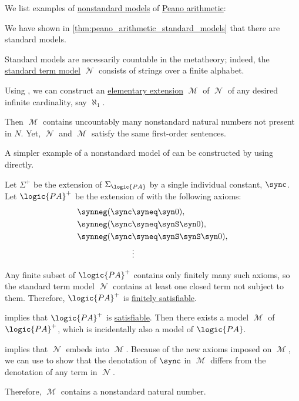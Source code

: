 \begin{example}\label{ex:peano_arithmetic_nonstandard_models}
  We list examples of \hyperref[def:peano_arithmetic_standard_model]{nonstandard models} of \hyperref[def:peano_arithmetic]{Peano arithmetic}:
  \begin{thmenum}
     We have shown in \cref{thm:peano_arithmetic_standard_models} that there are standard models.

    Standard models are necessarily countable in the metatheory; indeed, the \hyperref[def:peano_arithmetic_term_model]{standard term model} \( \mscrN \) consists of strings over a finite alphabet.

    Using , we can construct an \hyperref[def:elementary_embedding]{elementary extension} \( \mscrM \) of \( \mscrN \) of any desired infinite cardinality, say \hyperref[def:aleph_hierarchy]{\( \aleph_1 \)}.

    Then \( \mscrM \) contains uncountably many nonstandard natural numbers not present in \( N \). Yet, \( \mscrN \) and \( \mscrM \) satisfy the same first-order sentences.

     A simpler example of a nonstandard model of  can be constructed by using  directly.

    Let \( \Sigma^+ \) be the extension of \( \Sigma_{\logic{PA}} \) by a single individual constant, \( \sync \). Let \( \logic{PA}^+ \) be the extension of  with the following axioms:
    \begin{align*}
      \synneg (\sync &\syneq \syn0), \\
      \synneg (\sync &\syneq \synS \syn0), \\
      \synneg (\sync &\syneq \synS \synS \syn0), \\
                     &\vdots
    \end{align*}

    Any finite subset of \( \logic{PA}^+ \) contains only finitely many such axioms, so the standard term model \( \mscrN \) contains at least one closed term not subject to them. Therefore, \( \logic{PA}^+ \) is \hyperref[def:finitely_satisfiable_set_of_sentences]{finitely satisfiable}.

     implies that \( \logic{PA}^+ \) is \hyperref[def:fol_semantics/satisfaction]{satisfiable}. Then there exists a model \( \mscrM \) of \( \logic{PA}^+ \), which is incidentally also a model of \( \logic{PA} \).

     implies that \( \mscrN \) embeds into \( \mscrM \). Because of the new axioms imposed on \( \mscrM \), we can use  to show that the denotation of \( \sync \) in \( \mscrM \) differs from the denotation of any term in \( \mscrN \).

    Therefore, \( \mscrM \) contains a nonstandard natural number.
  \end{thmenum}
\end{example}

